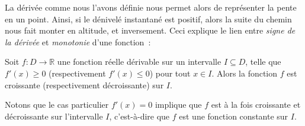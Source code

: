 La dérivée comme nous l'avons définie nous permet alors de représenter la pente en un point. Ainsi, si le dénivelé instantané est positif, alors la suite du chemin nous fait monter en altitude, et inversement. Ceci explique le lien entre \emph{signe de la dérivée} et \emph{monotonie} d'une fonction~:
\begin{boxthm}
    Soit $f : D \to \mathbb{R}$ une fonction réelle dérivable sur un intervalle $I \subseteq D$, telle que $f'(x) \geq 0$ (respectivement $f'(x) \leq 0$) pour tout $x \in I$. Alors la fonction $f$ est croissante (respectivement décroissante) sur $I$.
\end{boxthm}
Notons que le cas particulier $f'(x) = 0$ implique que $f$ est à la fois croissante et décroissante sur l'intervalle $I$, c'est-à-dire que $f$ est une fonction constante sur $I$.




    
    
    
    
    
